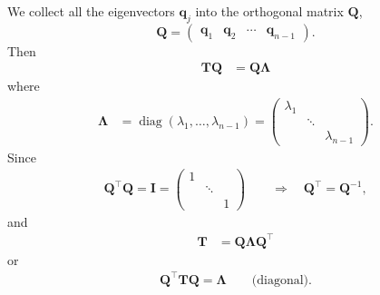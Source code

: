 We collect all the eigenvectors $\bm q_j$ into the orthogonal matrix $\bm Q$,
\begin{equation*}
  \bm Q = \begin{pmatrix} \bm q_1 & \bm q_2 & \cdots & \bm q_{n-1}\end{pmatrix}.
\end{equation*}
Then
\begin{align*}
  \bm T \bm Q &= \bm Q \bm \Lambda
\end{align*}
where
\begin{align*}
  \bm \Lambda &= \operatorname{diag}(\lambda_1, \ldots, \lambda_{n-1}) =
  \begin{pmatrix}
    \lambda_1 & & \\
     & \ddots & \\
    & & \lambda_{n-1}
  \end{pmatrix}.
\end{align*}
Since
\begin{align*}
  \bm Q^\intercal \bm Q = \bm I =
  \begin{pmatrix}
    1 & & \\
    & \ddots & \\
    & & 1
  \end{pmatrix} \qquad
  \Rightarrow \quad \bm Q^\intercal = \bm Q^{-1},
\end{align*}
and
\begin{align}
  \bm T &= \bm Q \bm \Lambda \bm Q^\intercal
  \label{eq:T_diag}
\end{align}
or
\begin{align*}
  \bm Q^\intercal \bm T \bm Q = \bm \Lambda \qquad \text{(diagonal)}.
\end{align*}

